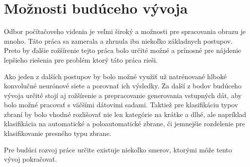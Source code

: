 
\section{Možnosti budúceho vývoja}

Odbor počítačoveho videnia je veľmi široký a možnosti pre spracovania obrazu je mnoho.
Táto práca sa zamerala a zhrnula iba niekoľko základnych postupov.
Preto by ďalšie rožšírenie tejto práca bolo určité možné a prínosné pre nájdenie lepšieho riešenia pre problém ktorý táto práca rieši.

Ako jeden z dalších postupov by bolo možné využiť už natrénované hlboké konvolučné neurónové siete a porovnať ich výsledky.
Za další z bodov budúceho vývoja určité stojí aj rožšírenie a prepracovanie generovania vstupných dát, aby bolo
    možné pracovať s väčšími dátovimi sadami.
Taktiež pre klasifikáciu typov zbraní by bolo vhodné rozlišovať nie len kategórie na krátke a dlhé, ale napríklad klasifikácia
    na automatické a poloautomatické zbrane, či jemnejšie rozdelenie pre klasifikovanie presného typu zbrane.

Pre budúci rozvoj práce určite existuje niekoľko smerov, ktorými môže tento vývoj pokračovať.
